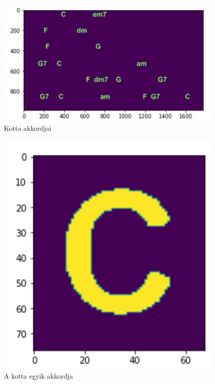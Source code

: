 \begin{figure}[h]
	\includegraphics[scale=0.5]{images/output_justchords.png}
	\caption{Kotta akkordjai}
	\label{fig:output2}
\end{figure}

\begin{figure}[h]
	\includegraphics[scale=0.5]{images/output_single_character.png}
	\caption{A kotta egyik akkordja}
	\label{fig:output3}
\end{figure}